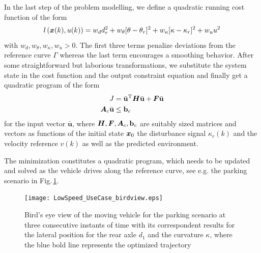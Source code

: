 In the last step of the problem modelling, we define a quadratic running cost function of the form 
\begin{align}
	l\left(\vektor x(k), u(k)\right) = w_d d_r^2 + w_\theta [\theta - \theta_r]^2 + w_\kappa [\kappa-\kappa_r]^2 + w_u u^2
	\label{equ:CostFunction}
\end{align}
with $w_d, w_\theta, w_\kappa, w_u > 0$. The first three terms penalize deviations from the reference curve $\Gamma$ whereas the last term encourages a smoothing behavior.
After some straightforward but laborious transformations, we substitute the system state in the cost function and the output constraint equation and finally get a quadratic program of the form
\newcommand{\U}{\bar{\mathbf u}}
\newcommand{\Z}{\mathbf z}
\newcommand{\X}{\mathbf x}
\newcommand{\Q}{\bs{\mathcal Q}}
\newcommand{\R}{\bs{\mathcal R}}
\newcommand{\bv}[1]{\mathbf #1} %
\begin{align}
	J
	&= \U^\T \mat H \U + \mat F \U \\
	\mat A_c  \U &\leq \bv b_c
\end{align}
for the input vector $\U$, where $\mat H, \mat F, \mat A_c, \bv b_c$ are suitably sized matrices and vectors as functions of the initial state $\boldsymbol{x}_0$ the disturbance signal $\kappa_r(k)$ and the velocity reference $v(k)$ as well as the predicted environment.

The minimization constitutes a quadratic program, which needs to be updated and solved as the vehicle drives along the reference curve, see e.g. the parking scenario in Fig.\,\ref{fig:LowSpeedBirdView}.




\begin{figure}[t!]
\centering

\renewcommand{\matlabtextA}{\tiny}
	\def\ylabelDr{$d_1$}
	\def\ylabelKappa{$\kappa_r, \kappa$ in \unitfrac{1}{m}}
	\def\xlabelDr{$s_r$ in \unit{m}}
	\def\xlabelKappa{$k$}
\texttt{[image: LowSpeed\_UseCase\_birdview.eps]}
\caption{Bird's eye view of the moving vehicle for the parking scenario at three consecutive instants of time with its correspondent results for the lateral position for the rear axle $d_1$ and the curvature $\kappa$, where the blue bold line represents the optimized trajectory}
\label{fig:LowSpeedBirdView}
\end{figure}

